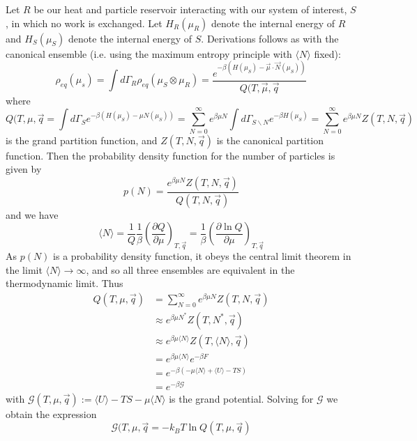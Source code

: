 \documentclass[12pt, a4paper, oneside, openright, titlepage]{book}
\begin{document}
Let $R$ be our heat and particle reservoir interacting with our system of interest, $S$, in which no work is exchanged. Let $H_R(\mu_R)$ denote the internal energy of $R$ and $H_S(\mu_S)$ denote the internal energy of $S$. Derivations follows as with the canonical ensemble (i.e. using the maximum entropy principle with $\langle N\rangle$ fixed): \begin{equation*}
    \rho_{eq}(\mu_s) = \int d\Gamma_R\rho_{eq}(\mu_S\otimes\mu_R) = \frac{e^{-\beta(H(\mu_S)-\vec{\mu}\cdot\vec{N}(\mu_S))}}{Q(T,\vec{\mu},\vec{q}}
\end{equation*}
where \begin{equation*}
    Q(T,\mu,\vec{q} = \int d\Gamma_S e^{-\beta(H(\mu_S) - \mu N(\mu_S))} = \sum_{N=0}^{\infty}e^{\beta\mu N}\int d\Gamma_{S\backslash N}e^{-\beta H(\mu_S)} = \sum_{N=0}^{\infty}e^{\beta\mu N}Z(T,N,\vec{q})
\end{equation*}
is the grand partition function, and $Z(T,N,\vec{q})$ is the canonical partition function. Then the probability density function for the number of particles is given by \begin{equation*}
    p(N) = \frac{e^{\beta\mu N}Z(T,N,\vec{q})}{Q(T,N,\vec{q})}
\end{equation*}
and we have \begin{equation*}
    \langle N\rangle = \frac{1}{Q}\frac{1}{\beta}\left(\frac{\partial Q}{\partial \mu}\right)_{T,\vec{q}} = \frac{1}{\beta}\left(\frac{\partial \ln Q}{\partial \mu}\right)_{T,\vec{q}}
\end{equation*}
As $p(N)$ is a probability density function, it obeys the central limit theorem in the limit $\langle N\rangle \rightarrow \infty$, and so all three ensembles are equivalent in the thermodynamic limit. Thus \begin{align*}
    Q(T,\mu,\vec{q}) &= \sum_{N=0}^{\infty}e^{\beta\mu N}Z(T,N,\vec{q}) \\
    &\approx e^{\beta \mu N^*}Z(T,N^*,\vec{q}) \tag{saddle point integration} \\
    &\approx e^{\beta \mu\langle N\rangle}Z(T,\langle N\rangle,\vec{q}) \tag{CLT} \\
    &= e^{\beta \mu\langle N\rangle}e^{-\beta F} \tag{substituting $F = -k_BT\ln Z$} \\
    &= e^{-\beta(-\mu\langle N\rangle + \langle U\rangle - TS)} \tag{substituting $F = \langle U\rangle - TS$} \\
    &= e^{-\beta\mathcal{G}}
\end{align*}
with $\mathcal{G}(T,\mu,\vec{q}) := \langle U\rangle - TS - \mu\langle N\rangle$ is the grand potential. Solving for $\mathcal{G}$ we obtain the expression \begin{equation*}
    \boxed{\mathcal{G}(T,\mu,\vec{q} = -k_BT\ln Q(T,\mu,\vec{q})}
\end{equation*}
\end{document}
